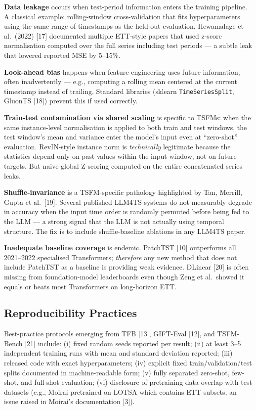 \documentclass{article}
\begin{document}
\textbf{Data leakage} occurs when test-period information enters the training pipeline. A classical example: rolling-window cross-validation that fits hyperparameters using the same range of timestamps as the held-out evaluation. Hewamalage et al.~(2022) {[}17{]} documented multiple ETT-style papers that used z-score normalisation computed over the full series including test periods --- a subtle leak that lowered reported MSE by 5--15\%.

\textbf{Look-ahead bias} happens when feature engineering uses future information, often inadvertently --- e.g., computing a rolling mean centered at the current timestamp instead of trailing. Standard libraries (sklearn \texttt{TimeSeriesSplit}, GluonTS {[}18{]}) prevent this if used correctly.

\textbf{Train-test contamination via shared scaling} is specific to TSFMs: when the same instance-level normalisation is applied to both train and test windows, the test window's mean and variance enter the model's input even at ``zero-shot'' evaluation. RevIN-style instance norm is \emph{technically} legitimate because the statistics depend only on past values within the input window, not on future targets. But naive global Z-scoring computed on the entire concatenated series leaks.

\textbf{Shuffle-invariance} is a TSFM-specific pathology highlighted by Tan, Merrill, Gupta et al.~{[}19{]}. Several published LLM4TS systems do not measurably degrade in accuracy when the input time order is randomly permuted before being fed to the LLM --- a strong signal that the LLM is not actually using temporal structure. The fix is to include shuffle-baseline ablations in any LLM4TS paper.

\textbf{Inadequate baseline coverage} is endemic. PatchTST {[}10{]} outperforms all 2021--2022 specialised Transformers; \emph{therefore} any new method that does not include PatchTST as a baseline is providing weak evidence. DLinear {[}20{]} is often missing from foundation-model leaderboards even though Zeng et al.~showed it equals or beats most Transformers on long-horizon ETT.

\subsection{Reproducibility Practices}\label{reproducibility-practices}

Best-practice protocols emerging from TFB {[}13{]}, GIFT-Eval {[}12{]}, and TSFM-Bench {[}21{]} include: (i) fixed random seeds reported per result; (ii) at least 3--5 independent training runs with mean and standard deviation reported; (iii) released code with exact hyperparameters; (iv) explicit fixed train/validation/test splits documented in machine-readable form; (v) fully separated zero-shot, few-shot, and full-shot evaluation; (vi) disclosure of pretraining data overlap with test datasets (e.g., Moirai pretrained on LOTSA which contains ETT subsets, an issue raised in Moirai's documentation {[}3{]}).
\end{document}
